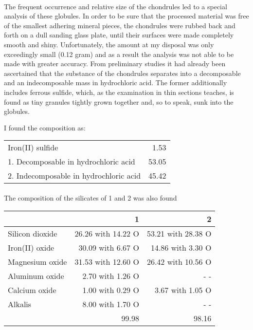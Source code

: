 \documentclass[a4paper, 12pt, oneside]{article}
\begin{document}
\paragraph{}
The frequent occurrence and relative size of the chondrules led to a special analysis of these globules. In order to be sure that the processed material was free of the smallest adhering mineral pieces, the chondrules were rubbed back and forth on a dull sanding glass plate, until their surfaces were made completely smooth and shiny. Unfortunately, the amount at my disposal was only exceedingly small (0.12 gram) and as a result the analysis was not able to be made with greater accuracy. From preliminary studies it had already been ascertained that the substance of the chondrules separates into a decomposable and an indecomposable mass in hydrochloric acid. The former additionally includes ferrous sulfide, which, as the examination in thin sections teaches, is found as tiny granules tightly grown together and, so to speak, sunk into the globules.

I found the composition as:
\begin{center}
    \begin{tabular}{l r}
        Iron(II) sulfide & 1.53\\
        1. Decomposable in hydrochloric acid & 53.05\\
        2. Indecomposable in hydrochloric acid & 45.42\\
    \end{tabular}
\end{center}
\paragraph{}
The composition of the silicates of 1 and 2 was also found  
\begin{center}
    \begin{tabular}{|l|r|r|}
        \hline
        & 1 & 2\\\hline
        Silicon dioxide & 26.26 with 14.22 O & 53.21 with 28.38 O\\\hline
        Iron(II) oxide & 30.09 with 6.67 O & 14.86 with 3.30 O\\\hline
        Magnesium oxide & 31.53 with 12.60 O & 26.42 with 10.56 O\\\hline
        Aluminum oxide & 2.70 with 1.26 O & - -\\\hline
        Calcium oxide & 1.00 with 0.29 O & 3.67 with 1.05 O\\\hline
        Alkalis & 8.00 with 1.70 O & - -\\\hline
        & 99.98 & 98.16\\
        \hline
    \end{tabular}
\end{center}
\end{document}
